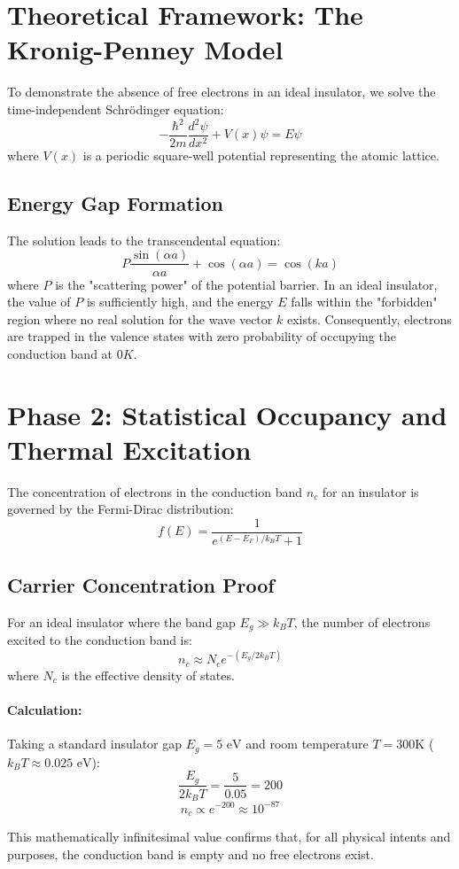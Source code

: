 \section{Theoretical Framework: The Kronig-Penney Model}
To demonstrate the absence of free electrons in an ideal insulator, we solve the time-independent Schrödinger equation:
$$-\frac{\hbar^2}{2m}\frac{d^2\psi}{dx^2} + V(x)\psi = E\psi$$
where $V(x)$ is a periodic square-well potential representing the atomic lattice. 

\subsection{Energy Gap Formation}
The solution leads to the transcendental equation:
$$P \frac{\sin(\alpha a)}{\alpha a} + \cos(\alpha a) = \cos(ka)$$
where $P$ is the "scattering power" of the potential barrier. In an ideal insulator, the value of $P$ is sufficiently high, and the energy $E$ falls within the "forbidden" region where no real solution for the wave vector $k$ exists. Consequently, electrons are trapped in the valence states with zero probability of occupying the conduction band at $0K$.
\section{Phase 2: Statistical Occupancy and Thermal Excitation}
The concentration of electrons in the conduction band $n_c$ for an insulator is governed by the Fermi-Dirac distribution:
$$f(E) = \frac{1}{e^{(E-E_F)/k_B T} + 1}$$

\subsection{Carrier Concentration Proof}
For an ideal insulator where the band gap $E_g \gg k_B T$, the number of electrons excited to the conduction band is:
$$n_c \approx N_c e^{-(E_g / 2k_B T)}$$
where $N_c$ is the effective density of states. 

\paragraph{Calculation:}
Taking a standard insulator gap $E_g = 5\text{ eV}$ and room temperature $T = 300\text{K}$ ($k_B T \approx 0.025\text{ eV}$):
$$\frac{E_g}{2k_B T} = \frac{5}{0.05} = 200$$
$$n_c \propto e^{-200} \approx 10^{-87}$$

This mathematically infinitesimal value confirms that, for all physical intents and purposes, the conduction band is empty and no free electrons exist.
